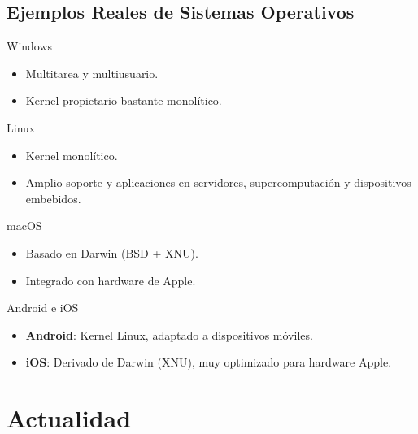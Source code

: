 \documentclass{beamer}
\begin{document}
\subsection{Ejemplos Reales de Sistemas Operativos}

\begin{frame}{Windows}
    \begin{itemize}
        \item Multitarea y multiusuario.
        \item Kernel propietario bastante monolítico.
    \end{itemize}
\end{frame}

\begin{frame}{Linux}
    \begin{itemize}
        \item Kernel monolítico.
        \item Amplio soporte y aplicaciones en servidores, supercomputación y dispositivos embebidos.
    \end{itemize}
\end{frame}

\begin{frame}{macOS}
    \begin{itemize}
        \item Basado en Darwin (BSD + XNU).
        \item Integrado con hardware de Apple.
    \end{itemize}
\end{frame}

\begin{frame}{Android e iOS}
    \begin{itemize}
        \item \textbf{Android}: Kernel Linux, adaptado a dispositivos móviles.
        \item \textbf{iOS}: Derivado de Darwin (XNU), muy optimizado para hardware Apple.
    \end{itemize}
\end{frame}


\section{Actualidad}
\end{document}

